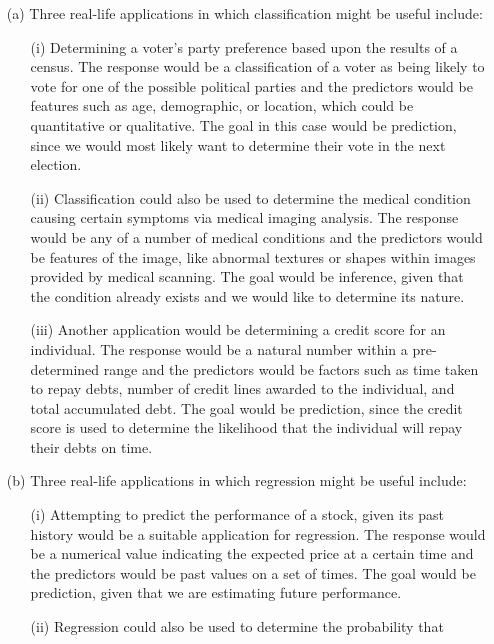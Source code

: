 
\begin{itemize}
    \item[(a)] Three real-life applications in which classification might be useful
    include: 
    \begin{itemize}
        \item[(i)] Determining a voter's party preference based upon the results of 
        a census. The response would be a classification of a voter as being likely 
        to vote for one of the possible political parties and the predictors would be 
        features such as age, demographic, or location, which could be quantitative
        or qualitative. The goal in this case would be prediction, since we would 
        most likely want to determine their vote in the next election.
        \item[(ii)] Classification could also be used to determine the medical 
        condition causing certain symptoms via medical imaging analysis. The 
        response would be any of a number of medical conditions and the predictors  
        would be features of the image, like abnormal textures or shapes within 
        images provided by medical scanning. The goal would be inference, given that 
        the condition already exists and we would like to determine its nature.
        \item[(iii)] Another application would be determining a credit score for
        an individual. The response would be a natural number within a pre-determined 
        range and the predictors would be factors such as time taken to repay debts,
        number of credit lines awarded to the individual, and total accumulated debt.
        The goal would be prediction, since the credit score is used to determine 
        the likelihood that the individual will repay their debts on time.
    \end{itemize}
    \item[(b)] Three real-life applications in which regression might be useful
    include:
    \begin{itemize}
        \item[(i)] Attempting to predict the performance of a stock, given its
        past history would be a suitable application for regression. The response
        would be a numerical value indicating the expected price at a certain time
        and the predictors would be past values on a set of times. The goal would
        be prediction, given that we are estimating future performance.
        \item[(ii)] Regression could also be used to determine the probability that 

\end{itemize}
\end{itemize}
